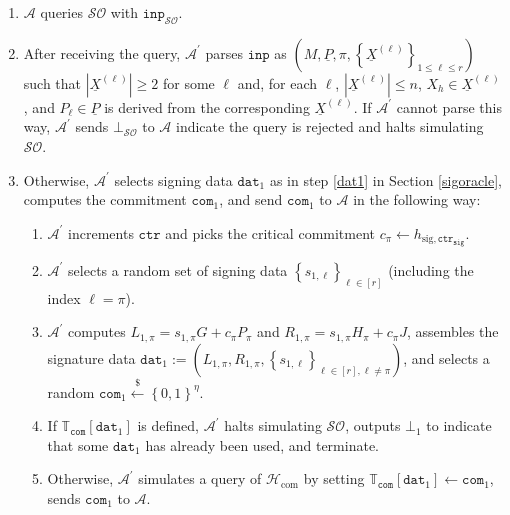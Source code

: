 \documentclass{mrl}
\theoremstyle{definition}
\numberwithin{theorem}{subsection}
\newcommand{\adversary}{\mathcal{A}}
\begin{document}
\begin{description}
\begin{description}
\begin{enumerate}
\item $\adversary$ queries $\mathcal{SO}$ with $\texttt{inp}_{\mathcal{SO}}$.

\item After receiving the query, $\adversary^\prime$ parses $\texttt{inp}$ as $\left(M, \underline{P}, \pi, \left\{\underline{X}^{(\ell)}\right\}_{1 \leq \ell \leq r}\right)$ such that $\left|\underline{X}^{(\ell)}\right| \geq 2$ for some $\ell$ and, for each $\ell$, $\left|\underline{X}^{(\ell)}\right| \leq n$, $X_h \in \underline{X}^{(\ell)}$, and $P_\ell \in \underline{P}$ is derived from the corresponding $\underline{X}^{(\ell)}$. If $\adversary^\prime$ cannot parse this way, $\adversary^\prime$ sends $\bot_{\mathcal{SO}}$ to $\adversary$ indicate the query is rejected and halts simulating $\mathcal{SO}$.

\item Otherwise, $\adversary^\prime$ selects signing data $\texttt{dat}_1$ as in step \ref{dat1} in Section \ref{sigoracle}, computes the commitment $\texttt{com}_1$, and send $\texttt{com}_1$ to $\adversary$ in the following way: 
\begin{enumerate}
\item $\adversary^\prime$ increments $\texttt{ctr}$ and picks the critical commitment $c_\pi \leftarrow h_{\text{sig},\texttt{ctr}_{\texttt{sig}}}$. 

\item $\adversary^\prime$ selects a random set of signing data $\left\{s_{1,\ell}\right\}_{\ell \in [r]}$ (including the index $\ell = \pi$). 

\item $\adversary^\prime$ computes $L_{1, \pi} = s_{1,\pi} G + c_{\pi} P_\pi$ and $R_{1, \pi} = s_{1,\pi} H_\pi + c_\pi J$, assembles the signature data $\texttt{dat}_1 := (L_{1,\pi}, R_{1,\pi}, \left\{s_{1,\ell}\right\}_{\ell \in [r], \ell \neq \pi})$, and selects a random $\texttt{com}_1 \overset{\$}{\leftarrow} \left\{0,1\right\}^\eta$. 

\item If $\mathbb{T}_{\texttt{com}}[\texttt{dat}_1]$ is defined, $\adversary^\prime$ halts simulating $\mathcal{SO}$, outputs $\bot_1$ to indicate that some $\texttt{dat}_1$ has already been used, and terminate. 

\item Otherwise, $\adversary^\prime$ simulates a query of $\mathcal{H}_{\text{com}}$ by setting $\mathbb{T}_{\texttt{com}}\left[\texttt{dat}_1\right] \leftarrow \texttt{com}_1$, sends $\texttt{com}_1$ to $\adversary$. 


\end{enumerate}
\end{enumerate}
\end{description}
\end{description}
\end{document}
